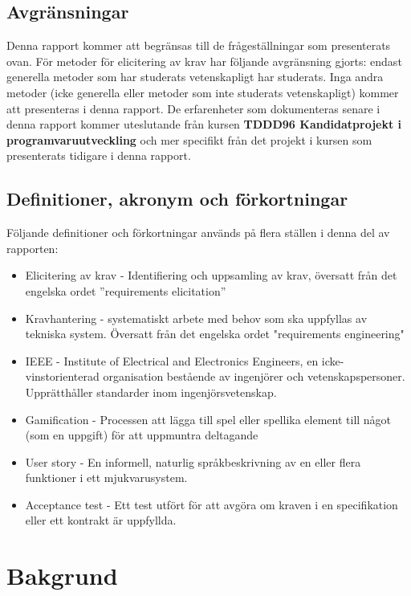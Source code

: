 \subsection{Avgränsningar}
Denna rapport kommer att begränsas till de frågeställningar som presenterats ovan. För metoder för elicitering av krav har följande avgränsning gjorts: endast generella metoder som har studerats vetenskapligt har studerats. Inga andra metoder (icke generella eller metoder som inte studerats vetenskapligt) kommer att presenteras i denna rapport. De erfarenheter som dokumenteras senare i denna rapport kommer uteslutande från kursen \textbf{TDDD96 	Kandidatprojekt i programvaruutveckling} och mer specifikt från det projekt i kursen som presenterats tidigare i denna rapport.   
\subsection{Definitioner, akronym och förkortningar}
Följande definitioner och förkortningar används på flera ställen i denna del av rapporten:
\begin{itemize}
	\item Elicitering av krav - Identifiering och uppsamling av krav, översatt från det engelska ordet ”requirements elicitation”
	\item Kravhantering - systematiskt arbete med behov som ska uppfyllas av tekniska system. Översatt från det engelska ordet "requirements engineering"
	\item IEEE - Institute of Electrical and Electronics Engineers, en icke-vinstorienterad organisation bestående av ingenjörer och vetenskapspersoner. Upprätthåller standarder inom ingenjörsvetenskap.
	\item Gamification - Processen att lägga till spel eller spellika element till något (som en uppgift) för att uppmuntra deltagande
	\item User story - En informell, naturlig språkbeskrivning av en eller flera funktioner i ett mjukvarusystem.
	\item Acceptance test - Ett test utfört för att avgöra om kraven i en specifikation eller ett kontrakt är uppfyllda.
\end{itemize}
\section{Bakgrund}
\label{sec:background-jannering}

